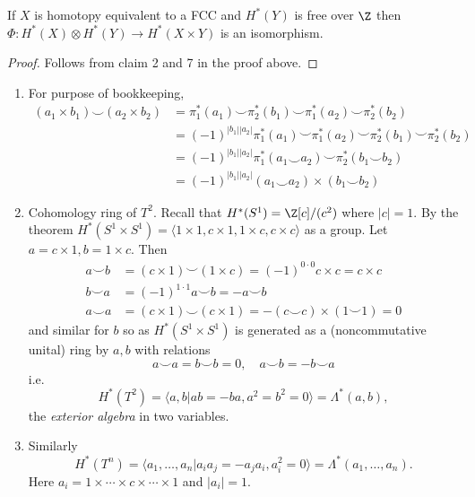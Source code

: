 \documentclass[a4paper]{article}
\newcommand*{\cp}{\smile} %
\begin{document}
\begin{theorem}
  If \(X\) is homotopy equivalent to a FCC and \(H^*(Y)\) is free over \(\Z\) then \(\Phi: H^*(X) \otimes H^*(Y) \to H^*(X \times Y)\) is an isomorphism.
\end{theorem}

\begin{proof}
  Follows from claim 2 and 7 in the proof above.
\end{proof}

\begin{eg}\leavevmode
  \begin{enumerate}
  \item For purpose of bookkeeping,
    \begin{align*}
      (a_1 \times b_1) \cp (a_2 \times b_2)
      &= \pi_1^*(a_1) \cp \pi_2^*(b_1) \cp \pi_1^*(a_2) \cp \pi_2^*(b_2) \\
      &= (-1)^{|b_1||a_2|} \pi_1^*(a_1) \cp \pi_1^*(a_2) \cp \pi_2^*(b_1) \cp \pi_2^*(b_2) \\
      &= (-1)^{|b_1||a_2|} \pi_1^*(a_1 \cp a_2) \cp \pi_2^*(b_1 \cp b_2) \\
      &= (-1)^{|b_1||a_2|} (a_1 \cp a_2) \times (b_1 \cp b_2)
    \end{align*}
  \item Cohomology ring of \(T^2\). Recall that \(H^*(S^1) = \Z[c]/(c^2)\) where \(|c| = 1\). By the theorem \(H^*(S^1 \times S^1) = \langle 1 \times 1, c \times 1, 1 \times c, c \times c \rangle\) as a group. Let \(a = c \times 1, b = 1 \times c\). Then
    \begin{align*}
      a \cp b &= (c \times 1) \cp (1 \times c) = (-1)^{0 \cdot 0} c \times c = c \times c \\
      b \cp a &= (-1)^{1 \cdot 1} a \cp b = - a \cp b \\
      a \cp a &= (c \times 1) \cp (c \times 1) = - (c \cp c) \times (1 \cp 1) = 0
    \end{align*}
    and similar for \(b\) so as \(H^*(S^1 \times S^1)\) is generated as a (noncommutative unital) ring by \(a, b\) with relations
    \[
      a \cp a = b \cp b = 0, \quad a \cp b = - b \cp a
    \]
    i.e.
    \[
      H^*(T^2) = \langle a, b | ab = -ba, a^2 = b^2 = 0 \rangle = \Lambda^*(a, b),
    \]
    the \emph{exterior algebra} in two variables.
  \item Similarly
    \[
      H^*(T^n) = \langle a_1, \dots, a_n | a_i a_j = -a_ja_i, a_i^2 = 0 \rangle = \Lambda^*(a_1, \dots, a_n).
    \]
    Here \(a_i = 1 \times \cdots \times c \times \cdots \times 1\) and \(|a_i| = 1\).

\end{enumerate}
\end{eg}
\end{document}
